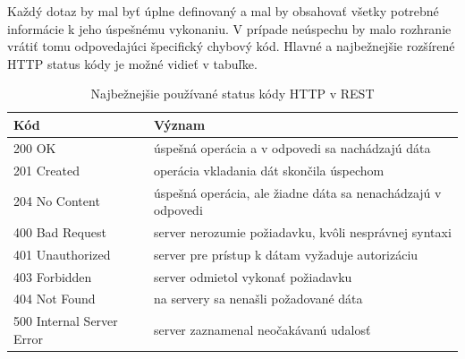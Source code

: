 Každý dotaz by mal byť úplne definovaný a mal by obsahovať všetky potrebné informácie k jeho úspešnému vykonaniu. V prípade neúspechu by malo rozhranie vrátiť tomu odpovedajúci špecifický chybový kód. Hlavné a najbežnejšie rozšírené HTTP status kódy je možné vidieť v tabuľke.
\begin{table}[h]
\centering
\begin{tabular}{|l|l|}
\hline
Kód                       & Význam                                                                 \\ \hline
200 OK                    & úspešná operácia a v odpovedi sa nachádzajú dáta  \\ \hline
201 Created               & operácia vkladania dát skončila úspechom                               \\ \hline
204 No Content            & úspešná operácia, ale žiadne dáta sa nenachádzajú v odpovedi \\ \hline
400 Bad Request           & server nerozumie požiadavku, kvôli nesprávnej syntaxi                  \\ \hline
401 Unauthorized          & server pre prístup k dátam vyžaduje autorizáciu                        \\ \hline
403 Forbidden             & server odmietol vykonať požiadavku                                     \\ \hline
404 Not Found             & na servery sa nenašli požadované dáta                                  \\ \hline
500 Internal Server Error & server zaznamenal neočakávanú udalosť                                  \\ \hline
\end{tabular}
\caption{Najbežnejšie používané status kódy HTTP v REST}
\label{tab:rest-codes}
\end{table}